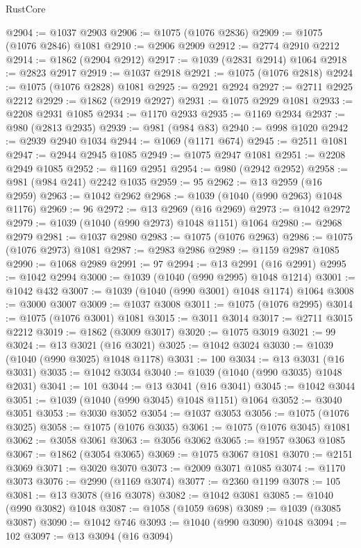 \begin{lexlean}{RustCore}
\begin{coremodule}
@2904 := @1037 @2903
@2906 := @1075 (@1076 @2836)
@2909 := @1075 (@1076 @2846) @1081
@2910 := @2906 @2909
@2912 := @2774 @2910 @2212
@2914 := @1862 (@2904 @2912)
@2917 := @1039 (@2831 @2914) @1064
@2918 := @2823 @2917
@2919 := @1037 @2918
@2921 := @1075 (@1076 @2818)
@2924 := @1075 (@1076 @2828) @1081
@2925 := @2921 @2924
@2927 := @2711 @2925 @2212
@2929 := @1862 (@2919 @2927)
@2931 := @1075 @2929 @1081
@2933 := @2208 @2931 @1085
@2934 := @1170 @2933
@2935 := @1169 @2934
@2937 := @980 (@2813 @2935)
@2939 := @981 (@984 @83)
@2940 := @998 @1020
@2942 := @2939 @2940 @1034
@2944 := @1069 (@1171 @674)
@2945 := @2511 @1081
@2947 := @2944 @2945 @1085
@2949 := @1075 @2947 @1081
@2951 := @2208 @2949 @1085
@2952 := @1169 @2951
@2954 := @980 (@2942 @2952)
@2958 := @981 (@984 @241) @2242 @1035
@2959 := 95
@2962 := @13 @2959 (@16 @2959)
@2963 := @1042 @2962
@2968 := @1039 (@1040 (@990 @2963) @1048 @1176)
@2969 := 96
@2972 := @13 @2969 (@16 @2969)
@2973 := @1042 @2972
@2979 := @1039 (@1040 (@990 @2973) @1048 @1151) @1064
@2980 := @2968 @2979
@2981 := @1037 @2980
@2983 := @1075 (@1076 @2963)
@2986 := @1075 (@1076 @2973) @1081
@2987 := @2983 @2986
@2989 := @1159 @2987 @1085
@2990 := @1068 @2989
@2991 := 97
@2994 := @13 @2991 (@16 @2991)
@2995 := @1042 @2994
@3000 := @1039 (@1040 (@990 @2995) @1048 @1214)
@3001 := @1042 @432
@3007 := @1039 (@1040 (@990 @3001) @1048 @1174) @1064
@3008 := @3000 @3007
@3009 := @1037 @3008
@3011 := @1075 (@1076 @2995)
@3014 := @1075 (@1076 @3001) @1081
@3015 := @3011 @3014
@3017 := @2711 @3015 @2212
@3019 := @1862 (@3009 @3017)
@3020 := @1075 @3019
@3021 := 99
@3024 := @13 @3021 (@16 @3021)
@3025 := @1042 @3024
@3030 := @1039 (@1040 (@990 @3025) @1048 @1178)
@3031 := 100
@3034 := @13 @3031 (@16 @3031)
@3035 := @1042 @3034
@3040 := @1039 (@1040 (@990 @3035) @1048 @2031)
@3041 := 101
@3044 := @13 @3041 (@16 @3041)
@3045 := @1042 @3044
@3051 := @1039 (@1040 (@990 @3045) @1048 @1151) @1064
@3052 := @3040 @3051
@3053 := @3030 @3052
@3054 := @1037 @3053
@3056 := @1075 (@1076 @3025)
@3058 := @1075 (@1076 @3035)
@3061 := @1075 (@1076 @3045) @1081
@3062 := @3058 @3061
@3063 := @3056 @3062
@3065 := @1957 @3063 @1085
@3067 := @1862 (@3054 @3065)
@3069 := @1075 @3067 @1081
@3070 := @2151 @3069
@3071 := @3020 @3070
@3073 := @2009 @3071 @1085
@3074 := @1170 @3073
@3076 := @2990 (@1169 @3074)
@3077 := @2360 @1199
@3078 := 105
@3081 := @13 @3078 (@16 @3078)
@3082 := @1042 @3081
@3085 := @1040 (@990 @3082) @1048
@3087 := @1058 (@1059 @698)
@3089 := @1039 (@3085 @3087)
@3090 := @1042 @746
@3093 := @1040 (@990 @3090) @1048
@3094 := 102
@3097 := @13 @3094 (@16 @3094)

\end{coremodule}
\end{lexlean}
